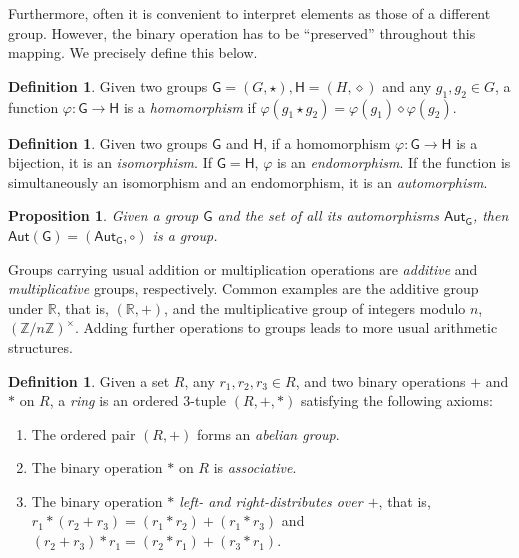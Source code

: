 \documentclass[12pt, a4paper, oneside]{memoir}
\newtheorem{proposition}[theorem]{Proposition}
\theoremstyle{definition}
\newtheorem{definition}[theorem]{Definition}
\begin{document}
Furthermore, often it is convenient to interpret elements as those of a different group. However, the binary operation has to be ``preserved'' throughout this mapping. We precisely define this below.

\begin{definition}\label{def:group-hom}
  Given two groups $\mathsf{G} = (G, \star), \mathsf{H} = (H, \diamond)$ and any $g_{1}, g_{2} \in G$, a function $\varphi : \mathsf{G} \to \mathsf{H}$ is a \emph{homomorphism} if $\varphi(g_{1} \star g_{2}) = \varphi(g_{1}) \diamond \varphi(g_{2})$.
\end{definition}

\begin{definition}\label{def:group-iso}
  Given two groups $\mathsf{G}$ and $\mathsf{H}$, if a homomorphism $\varphi : \mathsf{G} \to \mathsf{H}$ is a bijection, it is an \emph{isomorphism}. If $\mathsf{G} = \mathsf{H}$, $\varphi$ is an \emph{endomorphism}. If the function is simultaneously an isomorphism and an endomorphism, it is an \emph{automorphism}.
\end{definition}

\begin{proposition}\label{prop:group-aut}
  Given a group $\mathsf{G}$ and the set of all its automorphisms $\mathsf{Aut}_{\mathsf{G}}$, then $\mathsf{Aut}(\mathsf{G}) = (\mathsf{Aut}_{\mathsf{G}}, \circ)$ is a group.
\end{proposition}

Groups carrying usual addition or multiplication operations are \emph{additive} and \emph{multiplicative} groups, respectively. Common examples are the additive group under $\mathbb{R}$, that is, $(\mathbb{R}, +)$, and the multiplicative group of integers modulo $n$, $(\mathbb{Z}/n\mathbb{Z})^{\times}$. Adding further operations to groups leads to more usual arithmetic structures.

\begin{definition}
  Given a set $R$, any $r_{1}, r_{2}, r_{3} \in R$, and two binary operations $+$ and $\ast$ on $R$, a \emph{ring} is an ordered 3-tuple $(R, +, \ast)$ satisfying the following axioms:
  
  \begin{enumerate}
    \item The ordered pair $(R, +)$ forms an \emph{abelian group}.
    \item The binary operation $\ast$ on $R$ is \emph{associative}.
    \item The binary operation \emph{$\ast$ left- and right-distributes over $+$}, that is, $r_{1} \ast (r_{2} + r_{3}) = (r_{1} \ast r_{2}) + (r_{1} \ast r_{3})$ and $(r_{2} + r_{3}) \ast r_{1} = (r_{2} \ast r_{1}) + (r_{3} \ast r_{1})$.
  \end{enumerate}
\end{definition}
\end{document}
